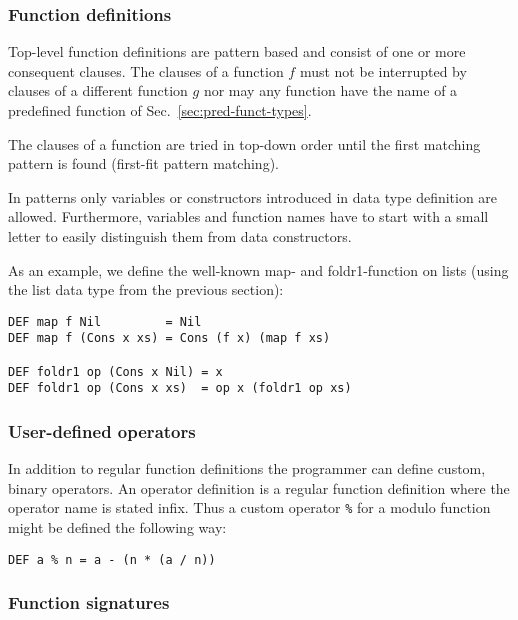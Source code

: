 \documentclass{article}
\begin{document}
\subsubsection{Function definitions}
\label{sec:function-definitions}

Top-level function definitions are pattern based and consist of one or
more consequent clauses. The clauses of a function $f$ must not be
interrupted by clauses of a different function $g$ nor may any
function have the name of a predefined function of
Sec.~\ref{sec:pred-funct-types}.

The clauses of a function are tried in top-down order until the first
matching pattern is found (first-fit pattern matching).

In patterns only variables or constructors introduced in data type
definition are allowed. Furthermore, variables and function names have
to start with a small letter to easily distinguish them from data
constructors.

As an example, we define the well-known map- and foldr1-function on
lists (using the list data type from the previous section):
\begin{verbatim}
DEF map f Nil         = Nil
DEF map f (Cons x xs) = Cons (f x) (map f xs)

DEF foldr1 op (Cons x Nil) = x
DEF foldr1 op (Cons x xs)  = op x (foldr1 op xs)
\end{verbatim}


\subsubsection{User-defined operators}
\label{sec:user-defined-ops}

In addition to regular function definitions the programmer can define
custom, binary operators. An operator definition is a regular function
definition where the operator name is stated infix. Thus a custom
operator \verb|%| for a modulo function might be defined the following
way:
\begin{verbatim}
DEF a % n = a - (n * (a / n))
\end{verbatim}


\subsubsection{Function signatures}
\label{sec:function-signatures}
\end{document}
